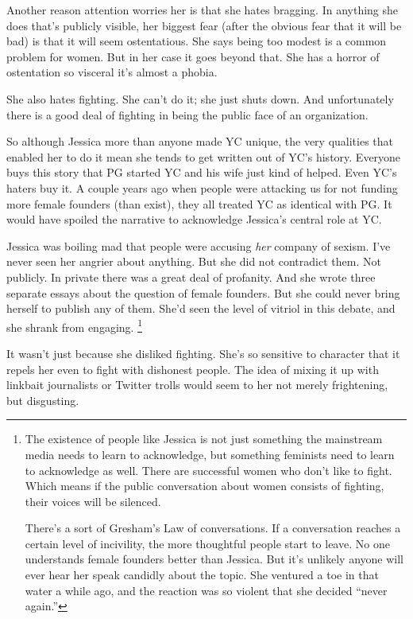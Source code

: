 \documentclass[12pt]{book}
\begin{document}
Another reason attention worries her is that she hates bragging. In
anything she does that's publicly visible, her biggest fear (after the
obvious fear that it will be bad) is that it will seem ostentatious. She
says being too modest is a common problem for women. But in her case it
goes beyond that. She has a horror of ostentation so visceral it's
almost a phobia.

She also hates fighting. She can't do it; she just shuts down. And
unfortunately there is a good deal of fighting in being the public face
of an organization.

So although Jessica more than anyone made YC unique, the very qualities
that enabled her to do it mean she tends to get written out of YC's
history. Everyone buys this story that PG started YC and his wife just
kind of helped. Even YC's haters buy it. A couple years ago when people
were attacking us for not funding more female founders (than exist),
they all treated YC as identical with PG. It would have spoiled the
narrative to acknowledge Jessica's central role at YC.

Jessica was boiling mad that people were accusing \emph{her} company of
sexism. I've never seen her angrier about anything. But she did not
contradict them. Not publicly. In private there was a great deal of
profanity. And she wrote three separate essays about the question of
female founders. But she could never bring herself to publish any of
them. She'd seen the level of vitriol in this debate, and she shrank
from engaging. \footnote{The existence of people like Jessica is not just something the
mainstream media needs to learn to acknowledge, but something feminists
need to learn to acknowledge as well. There are successful women who
don't like to fight. Which means if the public conversation about women
consists of fighting, their voices will be silenced.

There's a sort of Gresham's Law of conversations. If a conversation
reaches a certain level of incivility, the more thoughtful people start
to leave. No one understands female founders better than Jessica. But
it's unlikely anyone will ever hear her speak candidly about the topic.
She ventured a toe in that water a while ago, and the reaction was so
violent that she decided ``never again.''}

It wasn't just because she disliked fighting. She's so sensitive to
character that it repels her even to fight with dishonest people. The
idea of mixing it up with linkbait journalists or Twitter trolls would
seem to her not merely frightening, but disgusting.
\end{document}
